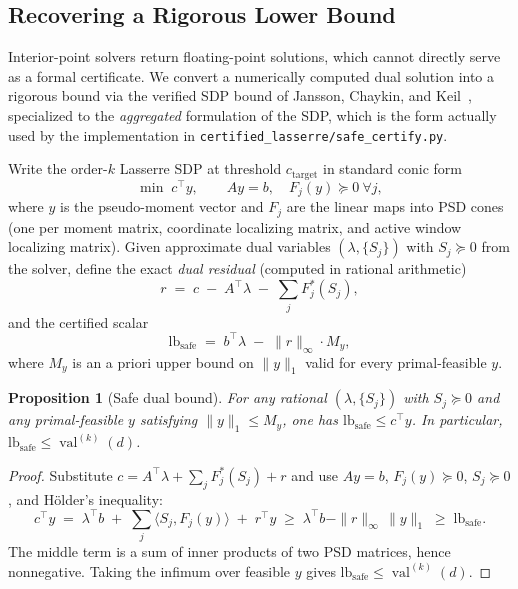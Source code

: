 \documentclass[11pt, letterpaper]{article}
\theoremstyle{paperplain}
\newtheorem{proposition}[theorem]{Proposition}
\theoremstyle{paperdef}
\newcommand{\val}{\operatorname{val}}
\begin{document}
\subsection{Recovering a Rigorous Lower Bound}\label{subsec:rigorous}

Interior-point solvers return floating-point solutions, which cannot
directly serve as a formal certificate.  We convert a numerically
computed dual solution into a rigorous bound via the verified SDP
bound of Jansson, Chaykin, and Keil~\cite{JanssonChaykinKeil2008},
specialized to the \emph{aggregated} formulation of the SDP, which is
the form actually used by the implementation in
\texttt{certified\_lasserre/safe\_certify.py}.

Write the order-$k$ Lasserre SDP at threshold $c_{\mathrm{target}}$ in
standard conic form
\[
  \min\;c^\top y,\qquad Ay = b,\quad F_j(y) \succeq 0\ \forall j,
\]
where $y$ is the pseudo-moment vector and $F_j$ are the linear maps
into PSD cones (one per moment matrix, coordinate localizing matrix,
and active window localizing matrix).  Given approximate dual variables
$(\lambda,\{S_j\})$ with $S_j\succeq 0$ from the solver, define the
exact \emph{dual residual} (computed in rational arithmetic)
\[
  r \;=\; c \;-\; A^\top \lambda \;-\; \sum_j F_j^\ast(S_j),
\]
and the certified scalar
\begin{equation}
\label{eq:safe-bound}
  \mathrm{lb}_{\mathrm{safe}}
  \;=\;
  b^\top \lambda \;-\; \|r\|_\infty \cdot M_y,
\end{equation}
where $M_y$ is an a priori upper bound on $\|y\|_1$ valid for every
primal-feasible $y$.

\begin{proposition}[Safe dual bound]\label{prop:safe-bound}
For any rational $(\lambda,\{S_j\})$ with $S_j\succeq 0$ and any
primal-feasible $y$ satisfying $\|y\|_1 \le M_y$, one has
$\mathrm{lb}_{\mathrm{safe}} \le c^\top y$.  In particular,
$\mathrm{lb}_{\mathrm{safe}} \le \val^{(k)}(d)$.
\end{proposition}

\begin{proof}
Substitute $c = A^\top\lambda + \sum_j F_j^\ast(S_j) + r$ and use
$Ay=b$, $F_j(y)\succeq 0$, $S_j\succeq 0$, and H\"older's inequality:
\[
  c^\top y
  \;=\;
  \lambda^\top b
  \;+\;
  \sum_j \langle S_j, F_j(y)\rangle
  \;+\;
  r^\top y
  \;\ge\;
  \lambda^\top b - \|r\|_\infty\,\|y\|_1
  \;\ge\;
  \mathrm{lb}_{\mathrm{safe}}.
\]
The middle term is a sum of inner products of two PSD matrices, hence
nonnegative.  Taking the infimum over feasible $y$ gives
$\mathrm{lb}_{\mathrm{safe}}\le \val^{(k)}(d)$.
\end{proof}
\end{document}
